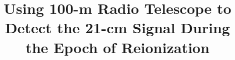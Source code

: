 \documentclass[linenumbers,trackchanges]{aastex701}
\begin{document}
\title{Using 100-m Radio Telescope to Detect the 21-cm Signal During the Epoch of Reionization
}

\end{document}
